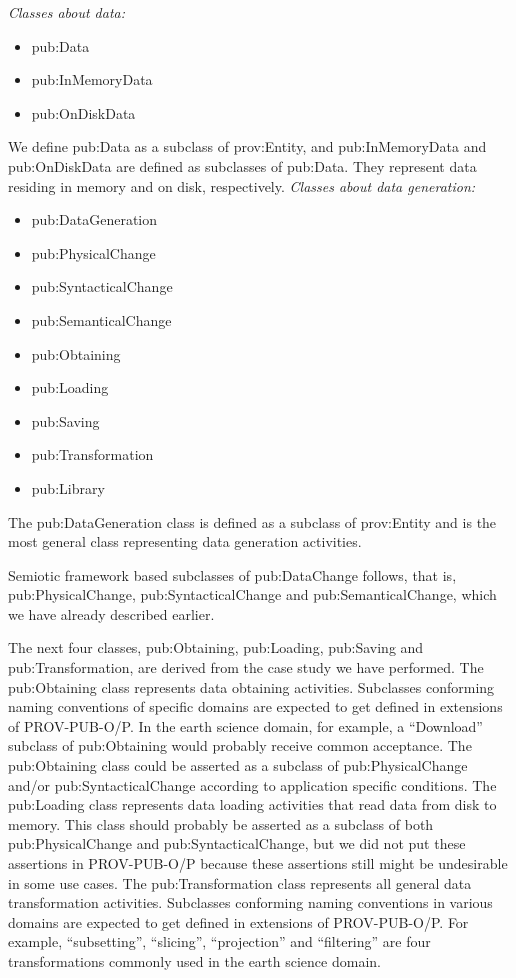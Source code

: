{\noindent\emph{Classes about data:}}
\begin{itemize}
	\item pub:Data
	\item pub:InMemoryData
	\item pub:OnDiskData
\end{itemize}
We define pub:Data as a subclass of prov:Entity, and pub:InMemoryData and pub:OnDiskData are defined as subclasses of pub:Data. They represent data residing in memory and on disk, respectively.
{\noindent\emph{Classes about data generation:}}
\begin{itemize}
	\item pub:DataGeneration
	\item pub:PhysicalChange
	\item pub:SyntacticalChange
	\item pub:SemanticalChange
	\item pub:Obtaining
	\item pub:Loading
	\item pub:Saving
	\item pub:Transformation
	\item pub:Library
\end{itemize}
The pub:DataGeneration class is defined as a subclass of prov:Entity and is the most general class representing data generation activities. 

Semiotic framework based subclasses of pub:DataChange follows, that is, pub:PhysicalChange, pub:SyntacticalChange and pub:SemanticalChange, which we have already described earlier. 

The next four classes, pub:Obtaining, pub:Loading, pub:Saving and pub:Transformation, are derived from the case study we have performed. The pub:Obtaining class represents data obtaining activities. Subclasses conforming naming conventions of specific domains are expected to get defined in extensions of PROV-PUB-O/P. In the earth science domain, for example, a ``Download'' subclass of pub:Obtaining would probably receive common acceptance. The pub:Obtaining class could be asserted as a subclass of pub:PhysicalChange and/or pub:SyntacticalChange according to application specific conditions. The pub:Loading class represents data loading activities that read data from disk to memory. This class should probably be asserted as a subclass of both pub:PhysicalChange and pub:SyntacticalChange, but we did not put these assertions in PROV-PUB-O/P because these assertions still might be undesirable in some use cases. The pub:Transformation class represents all general data transformation activities. Subclasses conforming naming conventions in various domains are expected to get defined in extensions of PROV-PUB-O/P. For example, ``subsetting'', ``slicing'', ``projection'' and ``filtering'' are four transformations commonly used in the earth science domain.

